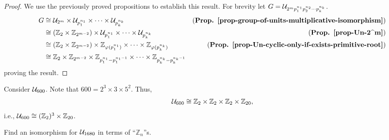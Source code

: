 \begin{proof}
    We use the previously proved propositions to establish this result. For brevity let $G = \mathcal{U}_{2^mp_1^{n_1}p_2^{n_2}\cdots p_k^{n_k}}$.
    \begin{align*}
        G &\cong \mathcal{U}_{2^m} \times \mathcal{U}_{p_1^{n_1}} \times\cdots\times \mathcal{U}_{p_k^{n_k}} & \text{(\textbf{Prop. \ref{prop-group-of-units-multiplicative-isomorphism}})}\\
        &\cong (\mathbb{Z}_2 \times \mathbb{Z}_{2^{m-2}}) \times \mathcal{U}_{p_1^{n_1}} \times\cdots\times \mathcal{U}_{p_k^{n_k}} & \text{(\textbf{Prop. \ref{prop-Un-2^m}})}\\
        &\cong (\mathbb{Z}_2 \times \mathbb{Z}_{2^{m-2}}) \times \mathbb{Z}_{\varphi(p_1^{n_1})} \times\cdots\times \mathbb{Z}_{\varphi(p_k^{n_k})} & \text{(\textbf{Prop. \ref{prop-Un-cyclic-only-if-exists-primitive-root}})}\\
        &\cong \mathbb{Z}_2\times\mathbb{Z}_{2^{m-2}}\times\mathbb{Z}_{p_1^{n_1} - p_1^{n_1-1}}\times\cdots\times\mathbb{Z}_{p_k^{n_k} - p_k^{n_k-1}}
    \end{align*}
    proving the result.
\end{proof}
\begin{example}
    Consider $\mathcal{U}_{600}$. Note that $600 = 2^3 \times 3 \times 5^2$. Thus,
    \[
        \mathcal{U}_{600} \cong \mathbb{Z}_2\times\mathbb{Z}_2    \times\mathbb{Z}_2\times\mathbb{Z}_{20},
    \]
    i.e., $\mathcal{U}_{600} \cong (\mathbb{Z}_2)^3 \times \mathbb{Z}_{20}$.
\end{example}

\begin{exercise}
    Find an isomorphism for $\mathcal{U}_{1680}$ in terms of ``$\mathbb{Z}_n$''s.
\end{exercise}

